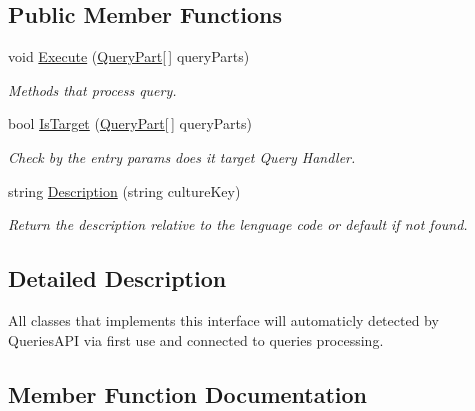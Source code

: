 \subsection*{Public Member Functions}
\begin{DoxyCompactItemize}
\item 
void \mbox{\hyperlink{interface_uniform_queries_1_1_i_query_handler_a66d15db03bdd5b0caf6eef96f9b803c0}{Execute}} (\mbox{\hyperlink{struct_uniform_queries_1_1_query_part}{Query\+Part}}\mbox{[}$\,$\mbox{]} query\+Parts)
\begin{DoxyCompactList}\small\item\em Methods that process query. \end{DoxyCompactList}\item 
bool \mbox{\hyperlink{interface_uniform_queries_1_1_i_query_handler_abda1ccf47ad2889fbd015955965046e7}{Is\+Target}} (\mbox{\hyperlink{struct_uniform_queries_1_1_query_part}{Query\+Part}}\mbox{[}$\,$\mbox{]} query\+Parts)
\begin{DoxyCompactList}\small\item\em Check by the entry params does it target Query Handler. \end{DoxyCompactList}\item 
string \mbox{\hyperlink{interface_uniform_queries_1_1_i_query_handler_abe2d1124630ca8d74b7398d11c873526}{Description}} (string culture\+Key)
\begin{DoxyCompactList}\small\item\em Return the description relative to the lenguage code or default if not found. \end{DoxyCompactList}\end{DoxyCompactItemize}


\subsection{Detailed Description}
All classes that implements this interface will automaticly detected by Queries\+A\+PI via first use and connected to queries processing. 



\subsection{Member Function Documentation}
\mbox{\label{interface_uniform_queries_1_1_i_query_handler_abe2d1124630ca8d74b7398d11c873526}} 
